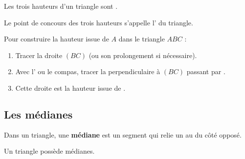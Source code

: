 \begin{proprietebox}[Orthocentre]
	Les trois hauteurs d'un triangle sont .

	Le point de concours des trois hauteurs s'appelle l'\textbf{} du triangle.
\end{proprietebox}

\begin{methodebox}
	Pour construire la hauteur issue de $A$ dans le triangle $ABC$ :
	\begin{enumerate}
		\item Tracer la droite $(BC)$ (ou son prolongement si nécessaire).
		\item Avec l' ou le compas, tracer la perpendiculaire à $(BC)$ passant par .
		\item Cette droite est la hauteur issue de .
	\end{enumerate}
\end{methodebox}

\subsection{Les médianes}

\begin{definitionbox}
	Dans un triangle, une \textbf{médiane} est un segment qui relie un  au  du côté opposé.

	Un triangle possède  médianes.
\end{definitionbox}

